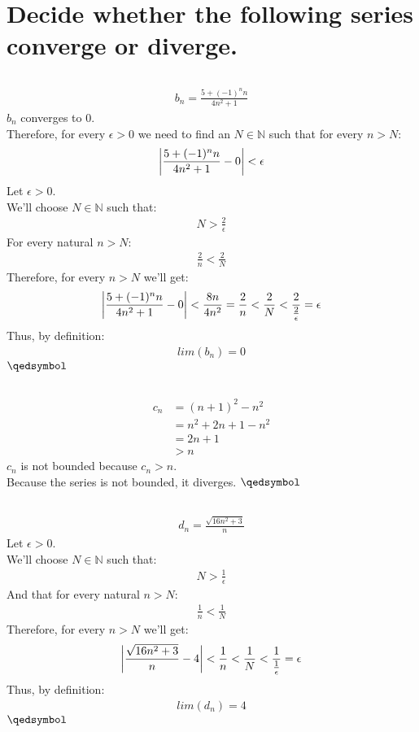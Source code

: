 \documentclass[a4paper, 12pt]{article}
\newcommand{\sub}[1]{\subsection{\underline{#1}}}
\newcommand{\N}{\ensuremath{\mathbb{N}}}
\newcommand{\eq}[1]{\begin{align*}#1\end{align*}}
\renewcommand{\qed}{\hfill\(\qedsymbol\)}
\begin{document}
\begin{titlepage}
    
\end{titlepage}

\section{Decide whether the following series converge or diverge.}
\setcounter{subsection}{1}
\sub{}
\eq{
    b_n=\frac
    {5+(-1)^nn}
    {4n^2+1}
}
$b_n$ converges to $0$.\\
Therefore, for every $\epsilon>0$ we need to find an $N\in\N$ such that for every $n>N$:
\eq{
    \bigg{|}
    \frac
    {5+(-1)^nn}
    {4n^2+1}
    -0
    \bigg{|}
    <\epsilon
}
Let $\epsilon>0$.\\
We'll choose $N\in\N$ such that:
\eq{
    N>\frac{2}{\epsilon}
}
For every natural $n>N$:
\eq{
    \frac{2}{n}<\frac{2}{N}
}
Therefore, for every $n>N$ we'll get:
\eq{
    \bigg{|}
    \frac
    {5+(-1)^nn}
    {4n^2+1}
    -0
    \bigg{|}
    <\frac{8n}{4n^2}
    =\frac{2}{n}
    <\frac{2}{N}
    <\frac{2}{\frac{2}{\epsilon}}
    =\epsilon
}
Thus, by definition:
\eq{
    lim(b_n)=0
}
\qed
\sub{}
\eq{
    c_n&=(n+1)^2-n^2\\
    &=n^2+2n+1-n^2\\
    &=2n+1\\
    &>n
}
$c_n$ is not bounded because $c_n>n$.\\
Because the series is not bounded, it diverges.
\qed\pagebreak
\sub{}
\eq{
    d_n=\frac
    {\sqrt{16n^2+3}}
    {n}
}
Let $\epsilon>0$.\\
We'll choose $N\in\N$ such that:
\eq{
    N>\frac{1}{\epsilon}
}
And that for every natural $n>N$:
\eq{
    \frac{1}{n}<\frac{1}{N}
}
Therefore, for every $n>N$ we'll get:
\eq{
    \bigg{|}
    \frac
    {\sqrt{16n^2+3}}
    {n}
    -4
    \bigg{|}
    <\frac{1}{n}
    <\frac{1}{N}
    <\frac{1}{\frac{1}{\epsilon}}
    =\epsilon
}
Thus, by definition:
\eq{
    lim(d_n)=4
}
\qed

\end{document}
